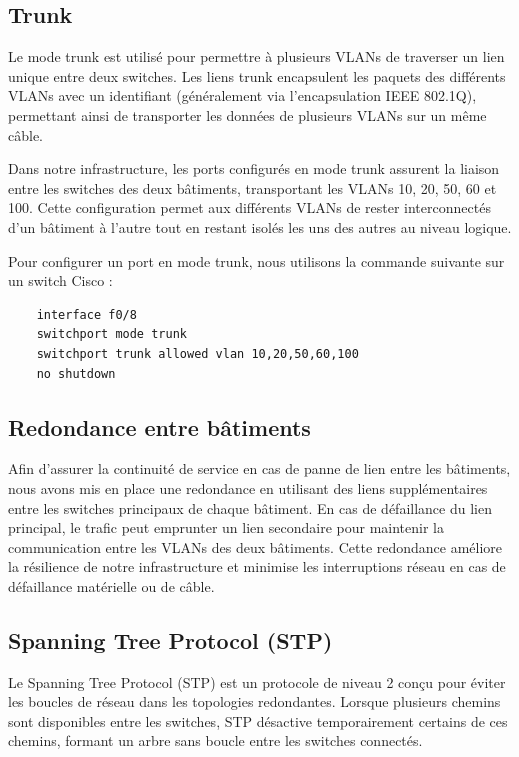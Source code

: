 \documentclass[a4paper,12pt]{report}
\begin{document}
            \subsection{Trunk}
                Le mode trunk est utilisé pour permettre à plusieurs VLANs de traverser un lien unique entre deux switches. Les liens trunk encapsulent les paquets des différents VLANs avec un identifiant (généralement via l'encapsulation IEEE 802.1Q), permettant ainsi de transporter les données de plusieurs VLANs sur un même câble.

                Dans notre infrastructure, les ports configurés en mode trunk assurent la liaison entre les switches des deux bâtiments, transportant les VLANs 10, 20, 50, 60 et 100. Cette configuration permet aux différents VLANs de rester interconnectés d'un bâtiment à l'autre tout en restant isolés les uns des autres au niveau logique. 

                Pour configurer un port en mode trunk, nous utilisons la commande suivante sur un switch Cisco :

                \begin{verbatim}
    interface f0/8
    switchport mode trunk
    switchport trunk allowed vlan 10,20,50,60,100
    no shutdown
                \end{verbatim}

            \subsection{Redondance entre bâtiments}
                Afin d'assurer la continuité de service en cas de panne de lien entre les bâtiments, nous avons mis en place une redondance en utilisant des liens supplémentaires entre les switches principaux de chaque bâtiment. En cas de défaillance du lien principal, le trafic peut emprunter un lien secondaire pour maintenir la communication entre les VLANs des deux bâtiments. Cette redondance améliore la résilience de notre infrastructure et minimise les interruptions réseau en cas de défaillance matérielle ou de câble.

            \subsection{Spanning Tree Protocol (STP)}
                Le Spanning Tree Protocol (STP) est un protocole de niveau 2 conçu pour éviter les boucles de réseau dans les topologies redondantes. Lorsque plusieurs chemins sont disponibles entre les switches, STP désactive temporairement certains de ces chemins, formant un arbre sans boucle entre les switches connectés. 
\end{document}
